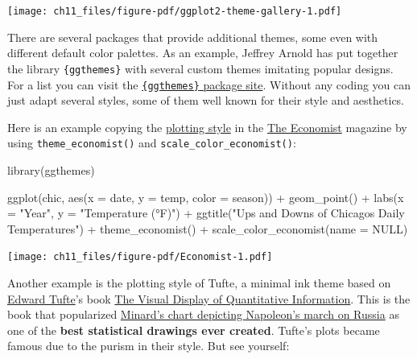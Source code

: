 \documentclass[
  letterpaper,
]{scrbook}
\newenvironment{Shaded}{\begin{snugshade}}{\end{snugshade}}
\newcommand{\AttributeTok}[1]{\textcolor[rgb]{0.40,0.45,0.13}{#1}}
\newcommand{\ConstantTok}[1]{\textcolor[rgb]{0.56,0.35,0.01}{#1}}
\newcommand{\FunctionTok}[1]{\textcolor[rgb]{0.28,0.35,0.67}{#1}}
\newcommand{\NormalTok}[1]{\textcolor[rgb]{0.00,0.23,0.31}{#1}}
\newcommand{\SpecialCharTok}[1]{\textcolor[rgb]{0.37,0.37,0.37}{#1}}
\newcommand{\StringTok}[1]{\textcolor[rgb]{0.13,0.47,0.30}{#1}}
\begin{document}
\texttt{[image: ch11\_files/figure-pdf/ggplot2-theme-gallery-1.pdf]}

There are several packages that provide additional themes, some even
with different default color palettes. As an example, Jeffrey Arnold has
put together the library \texttt{\{ggthemes\}} with several custom
themes imitating popular designs. For a list you can visit the
\href{https://github.com/jrnold/ggthemes}{\texttt{\{ggthemes\}} package
site}. Without any coding you can just adapt several styles, some of
them well known for their style and aesthetics.

Here is an example copying the
\href{https://www.google.de/search?q=economist+graphic&tbm=isch}{plotting
style} in the \href{http://www.economist.com/}{The Economist} magazine
by using \texttt{theme\_economist()} and
\texttt{scale\_color\_economist()}:

\begin{Shaded}
\begin{Highlighting}[]
\FunctionTok{library}\NormalTok{(ggthemes)}

\FunctionTok{ggplot}\NormalTok{(chic, }\FunctionTok{aes}\NormalTok{(}\AttributeTok{x =}\NormalTok{ date, }\AttributeTok{y =}\NormalTok{ temp, }\AttributeTok{color =}\NormalTok{ season)) }\SpecialCharTok{+}
  \FunctionTok{geom\_point}\NormalTok{() }\SpecialCharTok{+}
  \FunctionTok{labs}\NormalTok{(}\AttributeTok{x =} \StringTok{"Year"}\NormalTok{, }\AttributeTok{y =} \StringTok{"Temperature (°F)"}\NormalTok{) }\SpecialCharTok{+}
  \FunctionTok{ggtitle}\NormalTok{(}\StringTok{"Ups and Downs of Chicago\textquotesingle{}s Daily Temperatures"}\NormalTok{) }\SpecialCharTok{+}
  \FunctionTok{theme\_economist}\NormalTok{() }\SpecialCharTok{+}
  \FunctionTok{scale\_color\_economist}\NormalTok{(}\AttributeTok{name =} \ConstantTok{NULL}\NormalTok{)}
\end{Highlighting}
\end{Shaded}

\texttt{[image: ch11\_files/figure-pdf/Economist-1.pdf]}

Another example is the plotting style of Tufte, a minimal ink theme
based on \href{http://ww\%20w.aiga.org/medalist-edwardtufte}{Edward
Tufte}'s book \href{https://www.edwardtufte.com/tufte/books_vdqi}{The
Visual Display of Quantitative Information}. This is the book that
popularized \href{https://www.edwardtufte.com/tufte/minard}{Minard's
chart depicting Napoleon's march on Russia} as one of the \textbf{best
statistical drawings ever created}. Tufte's plots became famous due to
the purism in their style. But see yourself:
\end{document}
